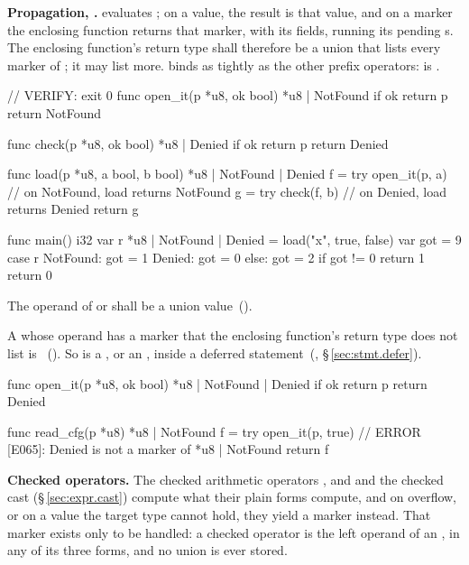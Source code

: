 \pnum
\textbf{Propagation, .}   evaluates ; on a value, the result is that
value, and on a marker the enclosing function returns that marker, with its fields, running its
pending s.  The enclosing function's return type shall therefore be a union that
lists every marker of ; it may list more.   binds as tightly as the other
prefix operators:  is .

\begin{laincode}
// VERIFY: exit 0
func open_it(p *u8, ok bool) *u8 | NotFound {
    if ok { return p }
    return NotFound
}

func check(p *u8, ok bool) *u8 | Denied {
    if ok { return p }
    return Denied
}

func load(p *u8, a bool, b bool) *u8 | NotFound | Denied {
    f = try open_it(p, a)      // on NotFound, load returns NotFound
    g = try check(f, b)        // on Denied, load returns Denied
    return g
}

func main() i32 {
    var r *u8 | NotFound | Denied = load("x", true, false)
    var got = 9
    case r {
        NotFound: got = 1
        Denied: got = 0
        else: got = 2
    }
    if got != 0 { return 1 }
    return 0
}
\end{laincode}

\begin{constraint}
  The operand of  or  shall be a union value~().
\end{constraint}

\begin{constraint}
  A  whose operand has a marker that the enclosing function's return type does not
  list is \illformed{}~().  So is a , or an , inside a
  deferred statement~(, \S\,\ref{sec:stmt.defer}).
\end{constraint}

\begin{laincode}
func open_it(p *u8, ok bool) *u8 | NotFound | Denied {
    if ok { return p }
    return Denied
}

func read_cfg(p *u8) *u8 | NotFound {
    f = try open_it(p, true)      // ERROR [E065]: Denied is not a marker of *u8 | NotFound
    return f
}
\end{laincode}

\pnum
\textbf{Checked operators.}  The checked arithmetic operators ,  and 
and the checked cast  (\S\,\ref{sec:expr.cast}) compute what their plain forms
compute, and on overflow, or on a value the target type cannot hold, they yield a marker
instead.  That marker exists only to be handled: a checked operator is the left operand of an
, in any of its three forms, and no union is ever stored.


